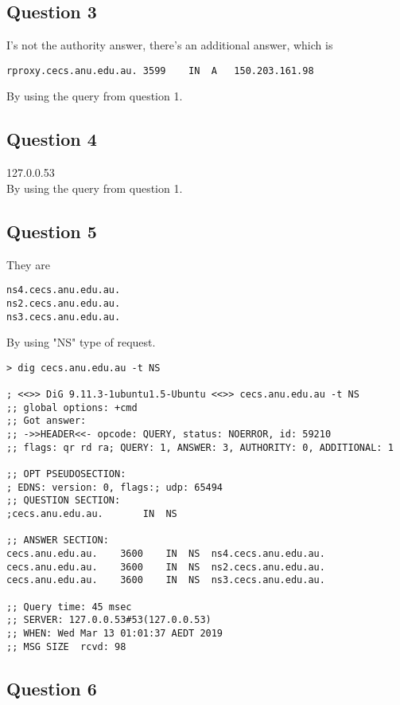 \documentclass{article}
\begin{document}
\subsection{Question 3}

I's not the authority answer, there's an additional answer, which is 

\begin{lstlisting}
rproxy.cecs.anu.edu.au.	3599	IN	A	150.203.161.98
\end{lstlisting}
 
By using the query from question 1.

\subsection{Question 4}

127.0.0.53 \\ 
By using the query from question 1.

\subsection{Question 5}

They are 

\begin{lstlisting}
ns4.cecs.anu.edu.au.
ns2.cecs.anu.edu.au.
ns3.cecs.anu.edu.au.
\end{lstlisting}

By using "NS" type of request.

\begin{lstlisting}
> dig cecs.anu.edu.au -t NS    

; <<>> DiG 9.11.3-1ubuntu1.5-Ubuntu <<>> cecs.anu.edu.au -t NS
;; global options: +cmd
;; Got answer:
;; ->>HEADER<<- opcode: QUERY, status: NOERROR, id: 59210
;; flags: qr rd ra; QUERY: 1, ANSWER: 3, AUTHORITY: 0, ADDITIONAL: 1

;; OPT PSEUDOSECTION:
; EDNS: version: 0, flags:; udp: 65494
;; QUESTION SECTION:
;cecs.anu.edu.au.		IN	NS

;; ANSWER SECTION:
cecs.anu.edu.au.	3600	IN	NS	ns4.cecs.anu.edu.au.
cecs.anu.edu.au.	3600	IN	NS	ns2.cecs.anu.edu.au.
cecs.anu.edu.au.	3600	IN	NS	ns3.cecs.anu.edu.au.

;; Query time: 45 msec
;; SERVER: 127.0.0.53#53(127.0.0.53)
;; WHEN: Wed Mar 13 01:01:37 AEDT 2019
;; MSG SIZE  rcvd: 98

\end{lstlisting}

\subsection{Question 6}
\end{document}
